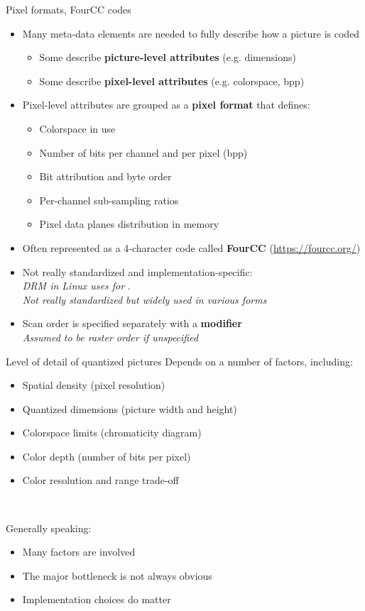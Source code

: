 \begin{frame}[fragile]{Pixel formats, FourCC codes}
  \begin{itemize}
  \item Many meta-data elements are needed to fully describe how a picture is coded
    \begin{itemize}
    \item Some describe \textbf{picture-level attributes} (e.g. dimensions)
    \item Some describe \textbf{pixel-level attributes} (e.g. colorspace, bpp)
    \end{itemize}
  \item Pixel-level attributes are grouped as a \textbf{pixel format} that defines:
    \begin{itemize}
    \item Colorspace in use
    \item Number of bits per channel and per pixel (bpp)
    \item Bit attribution and byte order
    \item Per-channel sub-sampling ratios
    \item Pixel data planes distribution in memory
    \end{itemize}
  \item Often represented as a 4-character code called \textbf{FourCC} {\small(\url{https://fourcc.org/})}\\
  \item Not really standardized and implementation-specific:\\
    \textit{DRM in Linux uses  for }.\\
  \textit{Not really standardized but widely used in various forms}
  \item Scan order is specified separately with a \textbf{modifier}\\
    \textit{Assumed to be raster order if unspecified}
  \end{itemize}
\end{frame}

\begin{frame}{Level of detail of quantized pictures}
  Depends on a number of factors, including:
  \begin{itemize}
  \item Spatial density (pixel resolution)
  \item Quantized dimensions (picture width and height)
  \item Colorspace limits (chromaticity diagram)
  \item Color depth (number of bits per pixel)
  \item Color resolution and range trade-off
  \end{itemize}~

  Generally speaking:
  \begin{itemize}
  \item Many factors are involved
  \item The major bottleneck is not always obvious
  \item Implementation choices do matter
  \end{itemize}
\end{frame}

